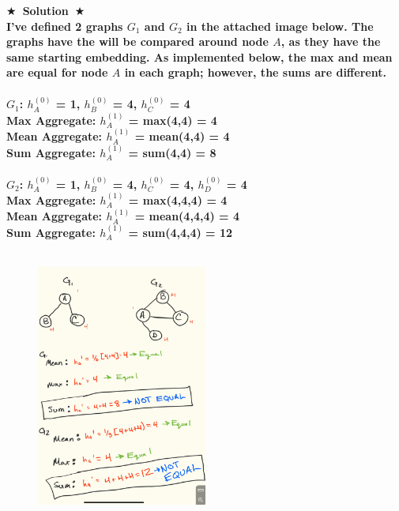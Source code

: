 \documentclass{article}
\numberwithin{figure}{section}
\newcommand{\Solution}[1]{{\medskip \color{red} \bf $\bigstar$~\sf \textbf{Solution}~$\bigstar$ \sf #1 } \bigskip}
\begin{document}
\Solution{\\I've defined 2 graphs $G_1$ and $G_2$ in the attached image below. The graphs have the will be compared around node $A$, as they have the same starting embedding. As implemented below, the max and mean are equal for node $A$ in each graph; however, the sums are different.
\\\\
\hspace{2cm}$G_1$: $h^{(0)}_{A}$ = 1, $h^{(0)}_{B}$ = 4, $h^{(0)}_{C}$ = 4
\\
\hspace{2cm} Max Aggregate: $h^{(1)}_{A}$ = max(4,4) = 4\\
\hspace{2cm} Mean Aggregate: $h^{(1)}_{A}$ = mean(4,4) = 4        \\
\hspace{2cm} Sum Aggregate: $h^{(1)}_{A}$ = sum(4,4) = 8           \\\\
\hspace{2cm}$G_2$: $h^{(0)}_{A}$ = 1, $h^{(0)}_{B}$ = 4, $h^{(0)}_{C}$ = 4, $h^{(0)}_{D}$ = 4
\\
\hspace{2cm} Max Aggregate: $h^{(1)}_{A}$ = max(4,4,4) = 4\\
\hspace{2cm} Mean Aggregate: $h^{(1)}_{A}$ = mean(4,4,4) = 4        \\
\hspace{2cm} Sum Aggregate: $h^{(1)}_{A}$ = sum(4,4,4) = 12           \\\\
\begin{figure}[H]
        \centering
\centering \includegraphics[width=0.5\textwidth]{CS224W_Homework1/graph_aggregate.jpg}
        \end{figure}

}
\end{document}
